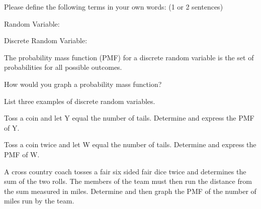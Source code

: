 \begin{problem}
  \item Please define the following terms in your own words: (1 or 2 sentences)

    \begin{subproblem}
      \item Random Variable:

        \vspace{4em}

      \item Discrete Random Variable:

        \vspace{4em}

    \end{subproblem}

    \begin{definition}
      The probability mass function (PMF) for a discrete random
      variable is the set of probabilities for all possible outcomes.
    \end{definition}

  \item How would you graph a probability mass function?

    \vspace{4em}

  \item List three examples of discrete random variables.

    \vfill

    \clearpage

  \item Toss a coin and let Y equal the number of tails. Determine and
    express the PMF  of Y.

    \vfill


  \item Toss a coin twice and let W equal the number of
    tails. Determine and express the PMF of W.

    \vfill


  \item A cross country coach tosses a fair six sided fair dice twice
    and determines the sum of the two rolls. The members of the team
    must then run the distance from the sum measured in miles.
    Determine and then graph the PMF of the number of miles run by the
    team.

    \vfill


\end{problem}




